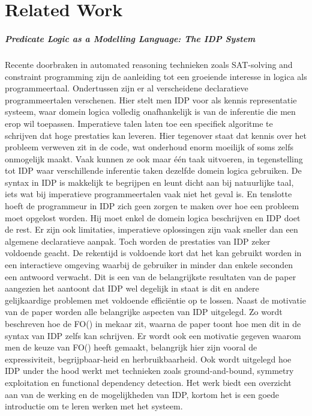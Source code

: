 \chapter{Related Work}
\label{cha:relatedwork}

\paragraph{Predicate Logic as a Modelling Language: The IDP System \cite{de2014predicate}}
Recente doorbraken in automated reasoning technieken zoals SAT-solving and constraint programming zijn de aanleiding tot een groeiende interesse in logica als programmeertaal. Ondertussen zijn er al verscheidene declaratieve programmeertalen verschenen. Hier stelt men IDP voor als kennis representatie systeem, waar domein logica volledig onafhankelijk is van de inferentie die men erop wil toepassen. Imperatieve talen laten toe een specifiek algoritme te schrijven dat hoge prestaties kan leveren. Hier tegenover staat dat kennis over het probleem verweven zit in de code, wat onderhoud enorm moeilijk of soms zelfs onmogelijk maakt. Vaak kunnen ze ook maar \'{e}\'{e}n taak uitvoeren, in tegenstelling tot IDP waar verschillende inferentie taken dezelfde domein logica gebruiken. De syntax in IDP is makkelijk te begrijpen en leunt dicht aan bij natuurlijke taal, iets wat bij imperatieve programmeertalen vaak niet het geval is. En tenslotte hoeft de programmeur in IDP zich geen zorgen te maken over hoe een probleem moet opgelost worden. Hij moet enkel de domein logica beschrijven en IDP doet de rest. Er zijn ook limitaties, imperatieve oplossingen zijn vaak sneller dan een algemene declaratieve aanpak. Toch worden de prestaties van IDP zeker voldoende geacht. De rekentijd is voldoende kort dat het kan gebruikt worden in een interactieve omgeving waarbij de gebruiker in minder dan enkele seconden een antwoord verwacht. Dit is een van de belangrijkste resultaten van de paper aangezien het aantoont dat IDP wel degelijk in staat is dit en andere gelijkaardige problemen met voldoende effici\"{e}ntie op te lossen. Naast de motivatie van de paper worden alle belangrijke aspecten van IDP uitgelegd. Zo wordt beschreven hoe de FO(\textperiodcentered) in mekaar zit, waarna de paper toont hoe men dit in de syntax van IDP zelfs kan schrijven. Er wordt ook een motivatie gegeven waarom men de keuze van FO(\textperiodcentered) heeft gemaakt, belangrijk hier zijn vooral de expressiviteit, begrijpbaar-heid en herbruikbaarheid. Ook wordt uitgelegd hoe IDP under the hood werkt met technieken zoals ground-and-bound, symmetry exploitation en functional dependency detection. Het werk biedt een overzicht aan van de werking en de mogelijkheden van IDP, kortom het is een goede introductie om te leren werken met het systeem.

